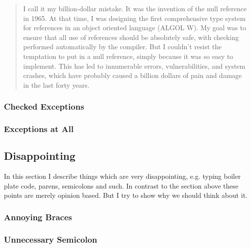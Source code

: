 \documentclass[a4paper,12pt]{article}
\begin{document}
\begin{quotation}
I call it my billion-dollar mistake. It was the invention of the null reference in 1965. At that time, I was designing the first comprehensive type system for references in an object oriented language (ALGOL W). My goal was to ensure that all use of references should be absolutely safe, with checking performed automatically by the compiler. But I couldn't resist the temptation to put in a null reference, simply because it was so easy to implement. This has led to innumerable errors, vulnerabilities, and system crashes, which have probably caused a billion dollars of pain and damage in the last forty years.	
\end{quotation} 


\subsubsection{Checked Exceptions}


\subsubsection{Exceptions at All}


\subsection{Disappointing}

In this section I describe things which are very disappointing, e.g. typing boiler plate code, parens, semicolons and such. In contrast to the section above these points are merely opinion based. But I try to show why we should think about it.

\subsubsection{Annoying Braces}


\subsubsection{Unnecessary Semicolon}
\end{document}
